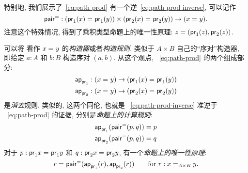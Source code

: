特别地, 我们展示了~\eqref{eq:path-prod} 有一个逆~\eqref{eq:path-prod-inverse}, 可以记作
\[
    \pairpath : (\id{\proj{1}(x)}{\proj{1}(y)}) \times (\id{\proj{2}(x)}{\proj{2}(y)}) \to (\id x y).
\]
注意这个特殊情况, 得到了乘积类型命题上的唯一性原理: $z = (\proj1(z),\proj2(z))$.

可以将 \pairpath 看作 $\id x y$ 的\emph{构造器}或者\emph{构造规则}, 类似于 $A\times B$ 自己的``序对''构造器, 即给定 $a:A$ 和 $b:B$ 构造序对 $(a,b)$.
从这个观点, ~\eqref{eq:path-prod} 的两个组成部分:
\begin{align*}
    \projpath{1} &: (\id{x}{y}) \to (\id{\proj{1}(x)}{\proj{1} (y)})\\
    \projpath{2} &: (\id{x}{y}) \to (\id{\proj{2}(x)}{\proj{2} (y)})
\end{align*}
是\emph{消去}规则.
类似的, 这两个同伦, 也就是 ~\eqref{eq:path-prod-inverse} 准逆于 ~\eqref{eq:path-prod} 的证据, 分别是\emph{命题上的计算规则}:
%
\begin{align*}
{\projpath{1}{(\pairpath(p, q)})}
    &= %
        {p} \\
    {\projpath{2}{(\pairpath(p,q)})}
    &= %
        {q}
\end{align*}
对于 $p:\id{\proj{1} x}{\proj{1} y}$ 和 $q:\id{\proj{2} x}{\proj{2} y}$, 有一个\emph{命题上的唯一性原理}:
%
\[
    \id{r}{\pairpath(\projpath{1} (r), \projpath{2} (r)) }
    \qquad\text{for } r : \id[A \times B] x y.
\]

